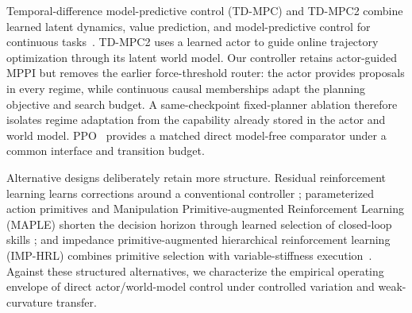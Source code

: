 Temporal-difference model-predictive control (TD-MPC) and TD-MPC2 combine
learned latent dynamics, value prediction, and
model-predictive control for continuous
tasks~\cite{hansen2022tdmpc,hansen2024tdmpc2}. TD-MPC2 uses a learned actor to
guide online trajectory optimization through its latent world model. Our
controller retains actor-guided MPPI but removes the earlier force-threshold
router: the actor provides proposals in every regime, while continuous causal
memberships adapt the planning objective and search budget. A same-checkpoint
fixed-planner ablation therefore isolates regime adaptation from the
capability already stored in the actor and world model.
PPO~\cite{schulman2017ppo} provides a matched direct model-free comparator
under a common interface and transition budget.

Alternative designs deliberately retain more structure. Residual reinforcement
learning learns corrections around a conventional controller
\cite{johannink2019residual}; parameterized action primitives and Manipulation
Primitive-augmented Reinforcement Learning (MAPLE) shorten
the decision horizon through learned selection of closed-loop skills
\cite{dalal2021raps,nasiriany2022maple}; and impedance primitive-augmented
hierarchical reinforcement learning (IMP-HRL) combines primitive
selection with variable-stiffness execution~\cite{tahmaz2025imphrl}. Against
these structured alternatives, we characterize the empirical operating
envelope of direct actor/world-model control under controlled variation and
weak-curvature transfer.
